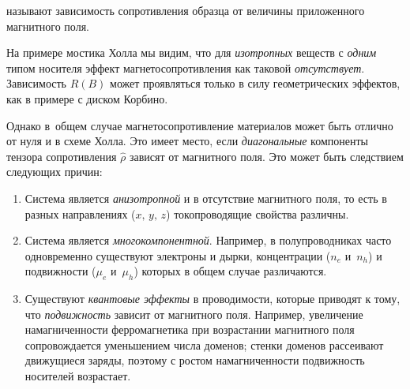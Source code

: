  называют зависимость
сопротивления образца от величины приложенного магнитного поля.

На примере мостика Холла мы видим, что для \emph{изотропных} веществ с
\emph{одним} типом носителя эффект магнетосопротивления
как таковой \emph{отсутствует}. Зависимость $R(B)$ может проявляться
только в силу геометрических эффектов, как в примере с диском Корбино.

Однако в~общем случае магнетосопротивление материалов может 
быть отлично от нуля и в схеме Холла. Это имеет место, если
\emph{диагональные} компоненты тензора сопротивления $\hat{\rho}$
зависят от магнитного поля. Это может быть следствием следующих причин:
\begin{enumerate}
    \item Система является \emph{анизотропной} и в отсутствие магнитного поля, то есть в разных
направлениях ($x,\,y,\,z$) токопроводящие свойства различны.

\item Система является \emph{многокомпонентной}. Например, в
полупроводниках часто одновременно существуют электроны и дырки, концентрации
($n_e$ и~$n_h$) и подвижности ($\mu_e$ и~$\mu_h$) которых в общем случае
различаются.

\item Существуют \emph{квантовые эффекты} в проводимости, которые приводят
к тому, что \emph{подвижность} зависит от магнитного поля. Например, 
увеличение намагниченности ферромагнетика при возрастании магнитного
поля сопровождается уменьшением числа доменов; стенки доменов
рассеивают движущиеся заряды, поэтому 
с ростом намагниченности подвижность носителей возрастает.
\end{enumerate}

